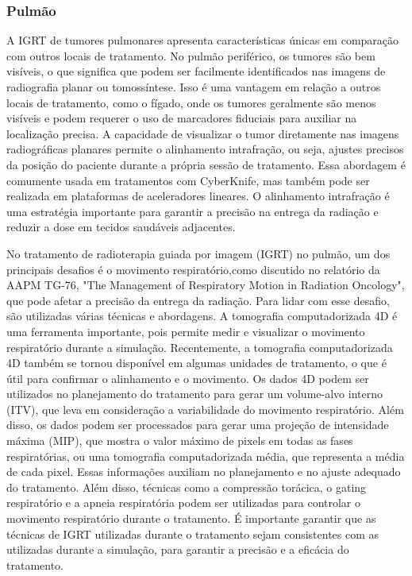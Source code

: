 \documentclass[11pt,a4paper]{article}
\begin{document}
\subsubsection*{Pulmão}

	A IGRT de tumores pulmonares apresenta características únicas em comparação com outros locais de tratamento. No pulmão periférico, os tumores são bem visíveis, o que significa que podem ser facilmente identificados nas imagens de radiografia planar ou tomossíntese. Isso é uma vantagem em relação a outros locais de tratamento, como o fígado, onde os tumores geralmente são menos visíveis e podem requerer o uso de marcadores fiduciais para auxiliar na localização precisa. A capacidade de visualizar o tumor diretamente nas imagens radiográficas planares permite o alinhamento intrafração, ou seja, ajustes precisos da posição do paciente durante a própria sessão de tratamento. Essa abordagem é comumente usada em tratamentos com CyberKnife, mas também pode ser realizada em plataformas de aceleradores lineares. O alinhamento intrafração é uma estratégia importante para garantir a precisão na entrega da radiação e reduzir a dose em tecidos saudáveis adjacentes.

	No tratamento de radioterapia guiada por imagem (IGRT) no pulmão, um dos principais desafios é o movimento respiratório,como discutido no relatório da AAPM TG-76, "The Management of Respiratory Motion in Radiation Oncology", que pode afetar a precisão da entrega da radiação. Para lidar com esse desafio, são utilizadas várias técnicas e abordagens. A tomografia computadorizada 4D é uma ferramenta importante, pois permite medir e visualizar o movimento respiratório durante a simulação. Recentemente, a tomografia computadorizada 4D também se tornou disponível em algumas unidades de tratamento, o que é útil para confirmar o alinhamento e o movimento. Os dados 4D podem ser utilizados no planejamento do tratamento para gerar um volume-alvo interno (ITV), que leva em consideração a variabilidade do movimento respiratório. Além disso, os dados podem ser processados para gerar uma projeção de intensidade máxima (MIP), que mostra o valor máximo de pixels em todas as fases respiratórias, ou uma tomografia computadorizada média, que representa a média de cada pixel. Essas informações auxiliam no planejamento e no ajuste adequado do tratamento. Além disso, técnicas como a compressão torácica, o gating respiratório e a apneia respiratória podem ser utilizadas para controlar o movimento respiratório durante o tratamento. É importante garantir que as técnicas de IGRT utilizadas durante o tratamento sejam consistentes com as utilizadas durante a simulação, para garantir a precisão e a eficácia do tratamento.
\end{document}

